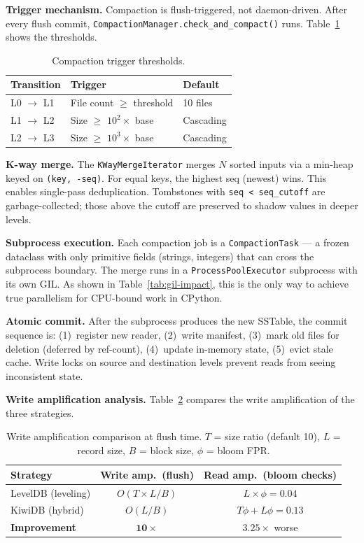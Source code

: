 \documentclass[conference]{IEEEtran}
\begin{document}
\textbf{Trigger mechanism.} Compaction is flush-triggered, not daemon-driven. After every flush commit, \texttt{CompactionManager.check\_and\_compact()} runs. Table~\ref{tab:compaction-triggers} shows the thresholds.

\begin{table}[t]
\centering
\caption{Compaction trigger thresholds.}
\label{tab:compaction-triggers}
\begin{tabular}{@{}lll@{}}
\toprule
\textbf{Transition} & \textbf{Trigger} & \textbf{Default} \\
\midrule
L0 $\rightarrow$ L1 & File count $\geq$ threshold & 10 files \\
L1 $\rightarrow$ L2 & Size $\geq$ $10^2 \times$ base & Cascading \\
L2 $\rightarrow$ L3 & Size $\geq$ $10^3 \times$ base & Cascading \\
\bottomrule
\end{tabular}
\end{table}

\textbf{K-way merge.} The \texttt{KWayMergeIterator} merges $N$ sorted inputs via a min-heap keyed on \texttt{(key, -seq)}. For equal keys, the highest seq (newest) wins. This enables single-pass deduplication. Tombstones with \texttt{seq < seq\_cutoff} are garbage-collected; those above the cutoff are preserved to shadow values in deeper levels.

\textbf{Subprocess execution.} Each compaction job is a \texttt{CompactionTask} --- a frozen dataclass with only primitive fields (strings, integers) that can cross the subprocess boundary. The merge runs in a \texttt{ProcessPoolExecutor} subprocess with its own GIL. As shown in Table~\ref{tab:gil-impact}, this is the only way to achieve true parallelism for CPU-bound work in CPython.

\textbf{Atomic commit.} After the subprocess produces the new SSTable, the commit sequence is: (1)~register new reader, (2)~write manifest, (3)~mark old files for deletion (deferred by ref-count), (4)~update in-memory state, (5)~evict stale cache. Write locks on source and destination levels prevent reads from seeing inconsistent state.

\textbf{Write amplification analysis.} Table~\ref{tab:write-amp} compares the write amplification of the three strategies.

\begin{table}[t]
\centering
\caption{Write amplification comparison at flush time. $T$ = size ratio (default 10), $L$ = record size, $B$ = block size, $\phi$ = bloom FPR.}
\label{tab:write-amp}
\begin{tabular}{@{}lcc@{}}
\toprule
\textbf{Strategy} & \textbf{Write amp.\ (flush)} & \textbf{Read amp.\ (bloom checks)} \\
\midrule
LevelDB (leveling) & $O(T \times L/B)$ & $L \times \phi = 0.04$ \\
KiwiDB (hybrid) & $O(L/B)$ & $T\phi + L\phi = 0.13$ \\
\midrule
\textbf{Improvement} & $\mathbf{10\times}$ & $3.25\times$ worse \\
\bottomrule
\end{tabular}
\end{table}
\end{document}
